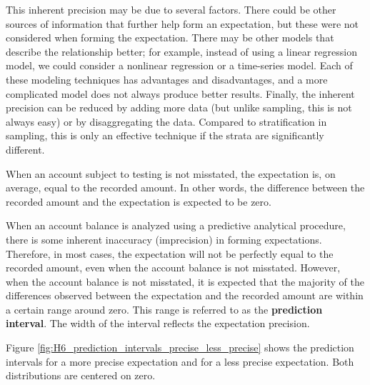 \bigskip
This inherent precision may be due to several factors. There could be other sources of information that further help form an expectation, but these were not considered when forming the expectation. There may be other models that describe the relationship better; for example, instead of using a linear regression model, we could consider a nonlinear regression or a time-series model. Each of these modeling techniques has advantages and disadvantages, and a more complicated model does not always produce better results. Finally, the inherent precision can be reduced by adding more data (but unlike sampling, this is not always easy) or by disaggregating the data. Compared to stratification in sampling, this is only an effective technique if the strata are significantly different. 

\bigskip
When an account subject to testing is not misstated, the expectation is, on average, equal to the recorded amount. In other words, the difference between the recorded amount and the expectation is expected to be zero.

When an account balance is analyzed using a predictive analytical procedure, there is some inherent inaccuracy (imprecision) in forming expectations. 
Therefore, in most cases, the expectation will not be perfectly equal to the recorded amount, even when the account balance is not misstated. 
However, when the account balance is not misstated, it is expected that the majority of the differences observed between the expectation and the recorded amount are within a certain range around zero. 
This range is referred to as the \textbf{prediction interval}. 
The width of the interval reflects the expectation precision.

Figure \ref{fig:H6_prediction_intervals_precise_less_precise} shows the prediction intervals for a more precise expectation and for a less precise expectation. 
Both distributions are centered on zero.

